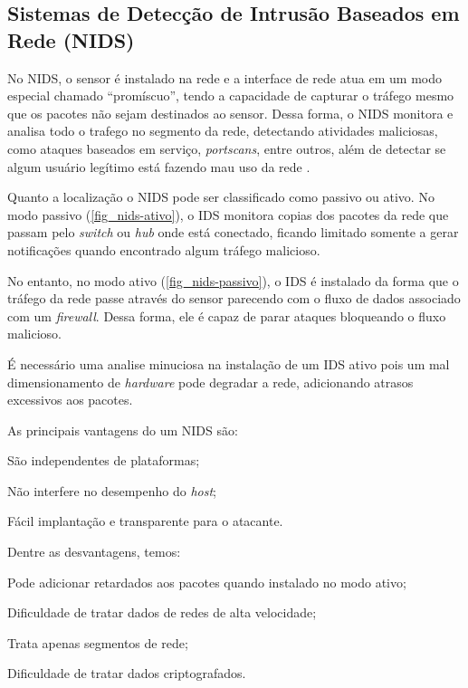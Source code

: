 \subsection{Sistemas de Detecção de Intrusão Baseados em Rede (NIDS)}

No NIDS, o sensor é instalado na rede e a interface de rede atua em um modo especial chamado ``promíscuo'', tendo a capacidade de capturar o tráfego mesmo que os pacotes não sejam destinados ao sensor. Dessa forma, o NIDS monitora e analisa todo o trafego no segmento da rede, detectando atividades maliciosas, como ataques baseados em serviço, \textit{portscans}, entre outros, além de detectar se algum usuário legítimo está fazendo mau uso da rede \cite{nagahama2012ipsflow}.

Quanto a localização o NIDS pode ser classificado como passivo ou ativo. No modo passivo (\autoref{fig_nids-ativo}), o IDS monitora copias dos pacotes da rede que passam pelo \textit{switch} ou \textit{hub} onde está conectado, ficando limitado somente a gerar notificações quando encontrado algum tráfego malicioso. 

No entanto, no modo ativo (\autoref{fig_nids-passivo}), o IDS é instalado da forma que o tráfego da rede passe através do sensor parecendo com o fluxo de dados associado com um \textit{firewall}. Dessa forma, ele é capaz de parar ataques bloqueando o fluxo malicioso. 

É necessário uma analise minuciosa na instalação de um IDS ativo pois um mal dimensionamento de \textit{hardware} pode degradar a rede, adicionando atrasos excessivos aos pacotes.

As principais vantagens do um NIDS são: 

\begin{alineas}
\item São independentes de plataformas;
\item Não interfere no desempenho do \textit{host};
\item Fácil implantação e transparente para o atacante.
\end{alineas}

Dentre as desvantagens, temos:

\begin{alineas}
\item Pode adicionar retardados aos pacotes quando instalado no modo ativo;
\item Dificuldade de tratar dados de redes de alta velocidade;
\item Trata apenas segmentos de rede;
\item Dificuldade de tratar dados criptografados.
\end{alineas}


